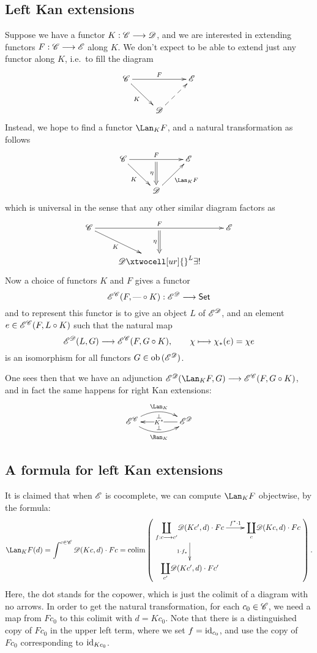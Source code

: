 \documentclass[11pt]{article}
\begin{document}
\subsection*{Left Kan extensions}
Suppose we have a functor $K:\mathscr{C}\longrightarrow\mathscr{D}$, and we are interested in extending functors $F:\mathscr{C}\longrightarrow\mathscr{E}$ along $K$. We don't expect to be able to extend just any functor along $K$, i.e.\ to fill the diagram
\[\xymatrix{
\scrC\ar[rr]^-{F}_-{}="1" \ar[rd]_-{K}&%
&%
\scrE\\%
&%
\scrD\ar@{-->}[ru]&%
}\]
Instead, we hope to find a functor $\Lan_KF$, and a natural transformation as follows
\[\xymatrix{
\scrC\ar[rd]_-{K}\ar[rr]^-{F}_-{}="arF"&%
&%
\scrE\\%
&%
\scrD\ar@{->}[ur]_{\Lan_KF}\ar@{=>}"arF";[]_-{\eta}&%
}\]
which is universal in the sense that any other similar diagram factors as
\[\xymatrix{
\scrC\ar[rd]_-{K}\ar[rr]^-{F}_-{}="arF"&%
&%
\scrE\\%
&%
\scrD\ar@{=>}"arF";[]_-{\eta}
\xtwocell[ur]{}^{L}{{\exists!}}&%
}\]
Now a choice of functors $K$ and $F$ gives a functor 
\[\mathscr{E}^{\mathscr{C}}(F,\textup{---}\circ K):\mathscr{E}^{\mathscr{D}}\longrightarrow\operatorname{{\mathsf{Set}}}\]
and to represent this functor is to give an object $L$ of $\mathscr{E}^{\mathscr{D}}$, and an element $e\in \mathscr{E}^{\mathscr{C}}(F,L\circ K)$ such that the natural map
\[\mathscr{E}^{\mathscr{D}}(L,G)\longrightarrow \mathscr{E}^{\mathscr{C}}(F,G\circ K),\qquad \chi\longmapsto \chi_*(e)=\chi e\]
is an isomorphism for all functors $G\in\textup{ob}\,(\mathscr{E}^{\mathscr{D}})$.

One sees then that we have an adjunction $\scrE^\scrD(\Lan_KF,G)\to \scrE^\scrC(F,G\circ K)$, and in fact the same happens for right Kan extensions:
\[\xymatrix@C=1.5cm{
\scrE^\scrC\ar@/^1.2em/[r]^-{\Lan_K}_-{\perp} \ar@/_1.2em/[r]_-{\Ran_K}^-{\perp}&%
\scrE^\scrD\ar[l]|{K^*}%
}\]
\subsection*{A formula for left Kan extensions}
It is claimed that when $\mathscr{E}$ is cocomplete, we can compute $\Lan_KF$ objectwise, by the formula:
\[\Lan_KF(d)=\int^{c\in\scrC}\scrD(Kc,d)\cdot Fc=
\colim\left(\vcenter{\xymatrix{
{\displaystyle\coprod_{f:c\to c'}}\scrD(Kc',d)\cdot Fc\ar[r]^-{f^*\cdot1}\ar[d]_-{1\cdot f_*}&%
{\displaystyle\coprod_{c}}\scrD(Kc,d)\cdot Fc\\%
{\displaystyle\coprod_{c'}}\scrD(Kc',d)\cdot Fc'&%
}}\right)
.\]
Here, the dot stands for the copower, which is just the colimit of a diagram with no arrows. In order to get the natural transformation, for each $c_0\in\mathscr{C}$, we need a map from $Fc_0$ to this colimit with $d=Kc_0$. 
Note that there is a distinguished copy of $Fc_0$ in the upper left term, where we set $f=\textup{id}_{c_0}$, and use the copy of $Fc_0$  corresponding to $\textup{id}_{Kc_0}$.
\end{document}

